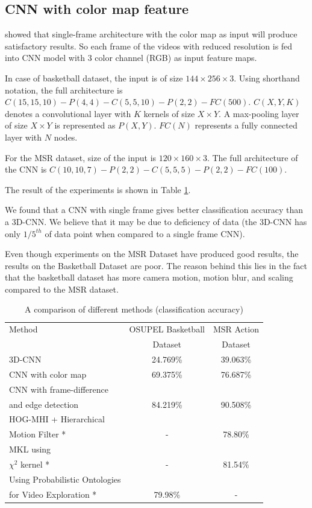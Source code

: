 \subsection{CNN with color map feature}
\citet{KarpathyCVPR14} showed that single-frame architecture with the color map as input will produce satisfactory results.  So each frame of the videos with reduced resolution is fed into CNN model with 3 color channel (RGB) as input feature maps.

In case of basketball dataset, the input is of size $144 \times 256 \times 3$.  Using shorthand notation, the full architecture is $C(15, 15, 10)-P(4, 4)-C(5, 5, 10)-P(2, 2)-FC(500)$. $C(X, Y, K)$ denotes a convolutional layer with $K$ kernels of size $X \times Y$.  A max-pooling layer of size $X \times Y$ is represented as $P(X,Y)$. $FC(N)$ represents a fully connected layer with $N$ nodes.

For the MSR dataset, size of the input is $120 \times 160 \times 3$.  The full architecture of the CNN is $C(10, 10, 7)-P(2, 2)-C(5, 5, 5)-P(2, 2)-FC(100)$.

The result of the experiments is shown in Table \ref{table:cnn_res}.

We found that a CNN with single frame gives better classification accuracy than a 3D-CNN.  We believe that it may be due to deficiency of data (the 3D-CNN has only $1/5^{th}$ of data point when compared to a single frame CNN).

Even though experiments on the MSR Dataset have produced good results, the results on the Basketball Dataset are poor.  The reason behind this lies in the fact that the basketball dataset has more camera motion, motion blur, and scaling compared to the MSR dataset.


\begin{table}[h]
\caption[A comparison of different methods (Classification Accuracy)]{A comparison of different methods (classification accuracy)}
\label{table:cnn_res}
\centering
\begin{tabular}{|l|c|c|}
\hline
Method & OSUPEL Basketball& MSR Action\\
       & Dataset          &Dataset \\
\hline
\hline
3D-CNN  &24.769\%   &39.063\% \\
\hline
CNN with color map  &69.375\%   &76.687\% \\
\hline
CNN with frame-difference &&\\
and edge detection &84.219\%   &90.508\% \\
\hline
HOG-MHI + Hierarchical &&\\
Motion Filter * \citep{tian2012hierarchical} & -  &78.80\% \\
\hline
MKL using&&\\
$\chi^2$ kernel * \citep{zhao2014feature} & -  &81.54\% \\
\hline
 Using Probabilistic Ontologies&&\\
 for Video Exploration * \citep{bustamante2012using} & 79.98\%   & - \\
\hline  
\end{tabular}
\end{table} 



